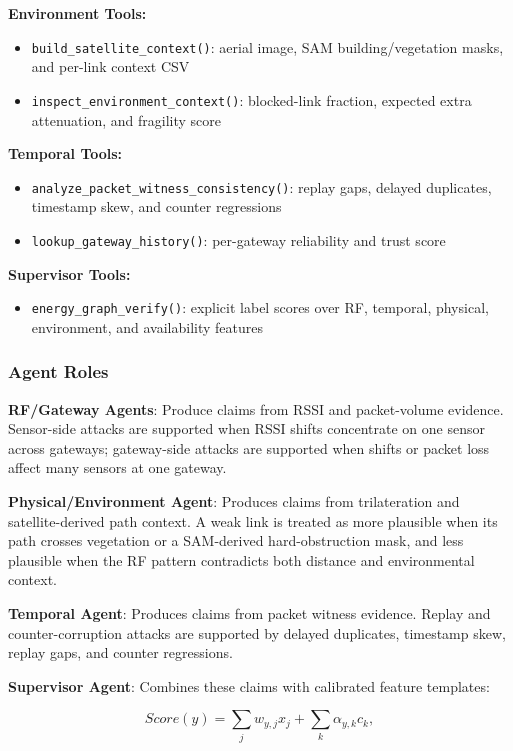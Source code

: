 \documentclass[10pt, twocolumn, letterpaper]{article}
\begin{document}
\textbf{Environment Tools:}
\begin{itemize}
    \item \texttt{build\_satellite\_context()}: aerial image, SAM building/vegetation masks, and per-link context CSV
    \item \texttt{inspect\_environment\_context()}: blocked-link fraction, expected extra attenuation, and fragility score
\end{itemize}

\textbf{Temporal Tools:}
\begin{itemize}
    \item \texttt{analyze\_packet\_witness\_consistency()}: replay gaps, delayed duplicates, timestamp skew, and counter regressions
    \item \texttt{lookup\_gateway\_history()}: per-gateway reliability and trust score
\end{itemize}

\textbf{Supervisor Tools:}
\begin{itemize}
    \item \texttt{energy\_graph\_verify()}: explicit label scores over RF, temporal, physical, environment, and availability features
\end{itemize}

\subsubsection{Agent Roles}

\textbf{RF/Gateway Agents}: Produce claims from RSSI and packet-volume evidence. Sensor-side attacks are supported when RSSI shifts concentrate on one sensor across gateways; gateway-side attacks are supported when shifts or packet loss affect many sensors at one gateway.

\textbf{Physical/Environment Agent}: Produces claims from trilateration and satellite-derived path context. A weak link is treated as more plausible when its path crosses vegetation or a SAM-derived hard-obstruction mask, and less plausible when the RF pattern contradicts both distance and environmental context.

\textbf{Temporal Agent}: Produces claims from packet witness evidence. Replay and counter-corruption attacks are supported by delayed duplicates, timestamp skew, replay gaps, and counter regressions.

\textbf{Supervisor Agent}: Combines these claims with calibrated feature templates:

\begin{equation}
Score(y) = \sum_j w_{y,j}x_j + \sum_k \alpha_{y,k}c_k ,
\end{equation}
\end{document}
